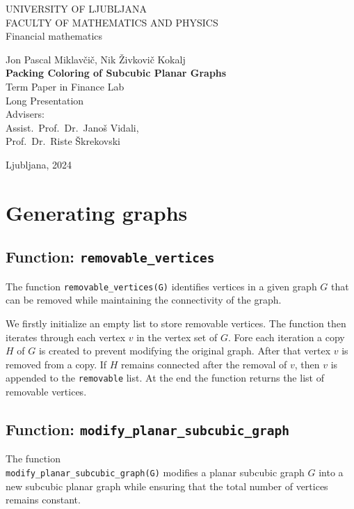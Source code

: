 \documentclass[12pt,a4paper]{amsart}
\theoremstyle{definition}
\theoremstyle{plain}
\newcommand{\program}{Financial mathematics}
\newcommand{\imeavtorja}{Jon Pascal Miklavčič, Nik Živkovič Kokalj}
\newcommand{\imementorja}{Assist.~Prof.~Dr.~Janoš Vidali}
\newcommand{\imesomentorja}{Prof.~Dr.~Riste Škrekovski}
\newcommand{\naslovdela}{Packing Coloring of Subcubic Planar Graphs}
\newcommand{\letnica}{2024}
\begin{document}
\thispagestyle{empty}
{\large
\noindent UNIVERSITY OF LJUBLJANA\\[1mm]
FACULTY OF MATHEMATICS AND PHYSICS\\[5mm]
\program\ }
\vfill

\begin{center}{\large
\imeavtorja\\[2mm]
{\bf \Large \naslovdela}\\[10mm]
{\normalsize Term Paper in Finance Lab}\\[1mm]
{\normalsize Long Presentation}\\[1cm]
{\normalsize Advisers:}\\
{\normalsize \imementorja, \\ \imesomentorja}\\[2mm]}
\end{center}
\vfill

{\large Ljubljana, \letnica}
\pagebreak

\section*{Generating graphs}

\subsection*{Function: \texttt{removable\_vertices}}

The function \texttt{removable\_vertices(G)} identifies vertices in a given graph \( G \) that can be removed while 
maintaining the connectivity of the graph.

We firstly initialize an empty list to store removable vertices. The function then iterates through each vertex \( v \) 
in the vertex set of \( G \). Fore each iteration a copy \( H \) of \( G \) is created to prevent modifying the original
graph. After that vertex \( v \) is removed from a copy. If \( H \) remains connected after the removal of \( v \), then 
\( v \) is appended to the \texttt{removable} list. At the end the function returns the list of removable vertices.


\subsection*{Function: \texttt{modify\_planar\_subcubic\_graph}} 

The function \\
\texttt{modify\_planar\_subcubic\_graph(G)} modifies a planar subcubic graph \( G \) into a new subcubic 
planar graph while ensuring that the total number of vertices remains constant.
\end{document}
